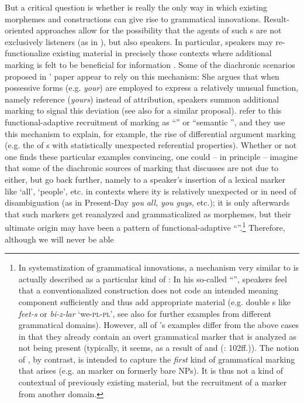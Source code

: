 \documentclass[output=paper]{langsci/langscibook}
\begin{document}
But a critical question is whether  is really the only way in which existing morphemes and constructions can give rise to grammatical innovations. Result-oriented approaches allow for the possibility that the agents of such s are not exclusively listeners (as in ), but also speakers. In particular, speakers may re-functionalize existing material in precisely those contexts where additional marking is felt to be beneficial for information . Some of the diachronic scenarios proposed in ’ paper appear to rely on this mechanism: She argues that when possessive  forms (e.g. \textit{your}) are employed to express a relatively unusual function, namely reference (\textit{yours}) instead of attribution, speakers summon additional marking to signal this deviation (see also \citealt{Croft1991,Croft2001} for a similar proposal). \citet{ZeevatJäger2002} refer to this functional-adaptive recruitment of marking as “” or “semantic ”, and they use this mechanism to explain, for example, the rise of differential argument marking (e.g. the  of s with statistically unexpected referential properties). Whether or not one finds these particular examples convincing, one could – in principle – imagine that some of the diachronic sources of  marking that  discusses are not due to  either, but go back further, namely to a speaker’s insertion of a lexical marker like ‘all’, ‘people’, etc. in contexts where ity is relatively unexpected or in need of disambiguation (as in Present-Day  \textit{you} \textit{all,} \textit{you} \textit{guys,} etc.); it is only afterwards that such markers get reanalyzed and grammaticalized as  morphemes, but their ultimate origin may have been a pattern of functional-adaptive “”.\footnote{In  systematization of grammatical innovations, a mechanism very similar to  is actually described as a particular kind of : In his so-called “”, speakers feel that a conventionalized construction does not code an intended meaning component sufficiently and thus add appropriate material (e.g. double s like  \textit{feet-s} or  \textit{bi-z-lar} ‘we-\textsc{pl}{}-\textsc{pl’}, see also \citealt{Koch1995} for further examples from different grammatical domains). However, all of ’s examples differ from the above cases in that they already contain an overt grammatical marker that is analyzed as not being present (typically, it seems, as a result of  and  (\citealt{Bybee2015}: 102ff.)). The notion of , by contrast, is intended to capture the \textit{first} kind of grammatical marking that arises (e.g. an   marker on formerly bare  NPs). It is thus not a kind of contextual  of previously existing material, but the recruitment of a marker from another domain.} Therefore, although we will never be able 
\end{document}
